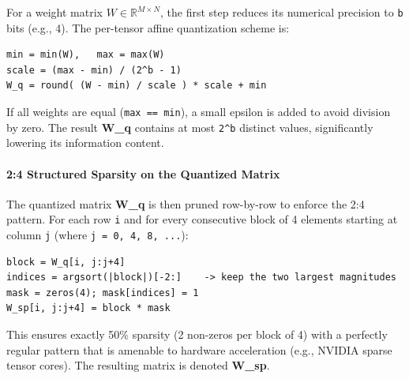 For a weight matrix $W \in \mathbb{R}^{M \times N}$, the first step reduces its numerical precision to \texttt{b} bits (e.g., 4). The per-tensor affine quantization scheme is:

\vspace{0.5em}
\begin{mdframed}[backgroundcolor=codebg, linecolor=codeframe, linewidth=1pt, roundcorner=4pt, innerleftmargin=2pt, innerrightmargin=5pt, innertopmargin=5pt, innerbottommargin=5pt]
\begin{lstlisting}
min = min(W),   max = max(W)
scale = (max - min) / (2^b - 1)
W_q = round( (W - min) / scale ) * scale + min
\end{lstlisting}
\end{mdframed}
\vspace{0.5em}

If all weights are equal (\texttt{max == min}), a small epsilon is added to avoid division by zero. The result \textbf{W\_q} contains at most \texttt{2\textasciicircum{}b} distinct values, significantly lowering its information content.

\paragraph{2:4 Structured Sparsity on the Quantized Matrix}

The quantized matrix \textbf{W\_q} is then pruned row-by-row to enforce the 2:4 pattern. For each row \texttt{i} and for every consecutive block of 4 elements starting at column \texttt{j} (where \texttt{j = 0, 4, 8, ...}):

\vspace{0.5em}
\begin{mdframed}[backgroundcolor=codebg, linecolor=codeframe, linewidth=1pt, roundcorner=4pt, innerleftmargin=2pt, innerrightmargin=5pt, innertopmargin=5pt, innerbottommargin=5pt]
\begin{lstlisting}
block = W_q[i, j:j+4]
indices = argsort(|block|)[-2:]    -> keep the two largest magnitudes
mask = zeros(4); mask[indices] = 1
W_sp[i, j:j+4] = block * mask
\end{lstlisting}
\end{mdframed}
\vspace{0.5em}

This ensures exactly 50\% sparsity (2 non-zeros per block of 4) with a perfectly regular pattern that is amenable to hardware acceleration (e.g., NVIDIA sparse tensor cores). The resulting matrix is denoted \textbf{W\_sp}.

